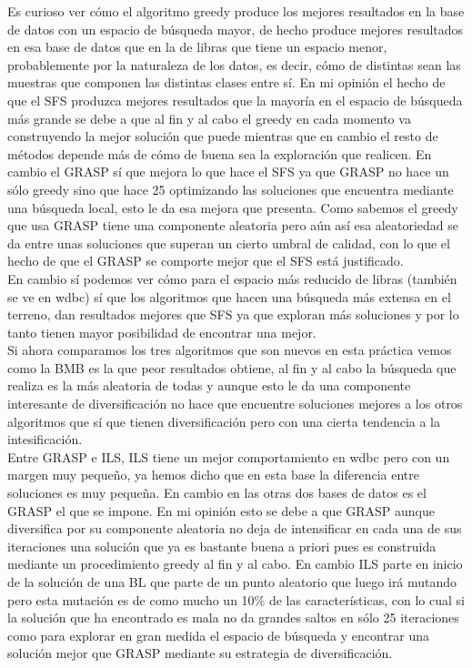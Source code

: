 \documentclass[10pt,a4paper]{article}
\begin{document}
Es curioso ver cómo el algoritmo greedy produce los mejores resultados en la base de datos con un espacio de búsqueda mayor, de hecho produce mejores resultados en esa base de datos que en la de libras que tiene un espacio menor, probablemente por la naturaleza de los datos, es decir, cómo de distintas sean las muestras que componen las distintas clases entre sí. En mi opinión el hecho de que el SFS produzca mejores resultados que la mayoría en el espacio de búsqueda más grande se debe a que al fin y al cabo el greedy en cada momento va construyendo la mejor solución que puede mientras que en cambio el resto de métodos depende más de cómo de buena sea la exploración que realicen. En cambio el GRASP sí que mejora lo que hace el SFS ya que GRASP no hace un sólo greedy sino que hace 25 optimizando las soluciones que encuentra mediante una búsqueda local, esto le da esa mejora que presenta. Como sabemos el greedy que usa GRASP tiene una componente aleatoria pero aún así esa aleatoriedad se da entre unas soluciones que superan un cierto umbral de calidad, con lo que el hecho de que el GRASP se comporte mejor que el SFS está justificado.\\

En cambio sí podemos ver cómo para el espacio más reducido de libras (también se ve en wdbc) sí que los algoritmos que hacen una búsqueda más extensa en el terreno, dan resultados mejores que SFS ya que exploran más soluciones y por lo tanto tienen mayor posibilidad de encontrar una mejor.\\

Si ahora comparamos los tres algoritmos que son nuevos en esta práctica vemos como la BMB es la que peor resultados obtiene, al fin y al cabo la búsqueda que realiza es la más aleatoria de todas y aunque esto le da una componente interesante de diversificación no hace que encuentre soluciones mejores a los otros algoritmos que sí que tienen diversificación pero con una cierta tendencia a la intesificación.\\

Entre GRASP e ILS, ILS tiene un mejor comportamiento en wdbc pero con un margen muy pequeño, ya hemos dicho que en esta base la diferencia entre soluciones es muy pequeña. En cambio en las otras dos bases de datos es el GRASP el que se impone. En mi opinión esto se debe a que GRASP aunque diversifica por su componente aleatoria no deja de intensificar en cada una de sus iteraciones una solución que ya es bastante buena a priori pues es construida mediante un procedimiento greedy al fin y al cabo. En cambio ILS parte en inicio de la solución de una BL que parte de un punto aleatorio que luego irá mutando pero esta mutación es de como mucho un 10\% de las características, con lo cual si la solución que ha encontrado es mala no da grandes saltos en sólo 25 iteraciones como para explorar en gran medida el espacio de búsqueda y encontrar una solución mejor que GRASP mediante su estrategia de diversificación.\\
\end{document}
